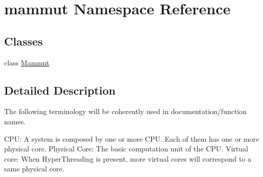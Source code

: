 \hypertarget{namespacemammut}{\section{mammut Namespace Reference}
\label{namespacemammut}
}
\subsection*{Classes}
\begin{DoxyCompactItemize}
\item 
class \hyperlink{classmammut_1_1Mammut}{Mammut}
\end{DoxyCompactItemize}


\subsection{Detailed Description}
The following terminology will be coherently used in documentation/function names.

C\-P\-U\-: A system is composed by one or more C\-P\-U. Each of them has one or more physical core. Physical Core\-: The basic computation unit of the C\-P\-U. Virtual core\-: When Hyper\-Threading is present, more virtual cores will correspond to a same physical core. 